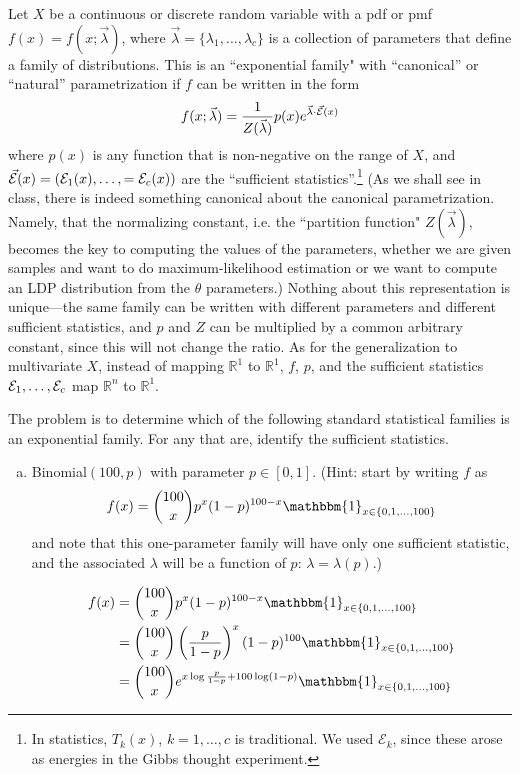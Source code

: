 \documentclass[11pt]{report}
\newcommand{\ind}{{\mathbbm{1}}}
\begin{document}
\begin{enumerate}[1.]
          Let $X$ be a continuous or discrete random variable with a pdf or pmf $f(x) = f(x;\vec{\lambda})$, where $\vec{\lambda} = \{\lambda_1,\ldots,\lambda_c\}$ is a collection of parameters that define a family of distributions. This is an ``exponential family" with ``canonical'' or ``natural'' parametrization if $f$ can be written in the form
          \begin{equation}
              \label{eqn:exp_family}
              f(x;\vec{\lambda}) = \frac{1}{Z(\vec{\lambda})}p(x)e^{\vec{\lambda}\cdot\vec{\cal E}(x)}
          \end{equation}
          where $p(x)$ is any function that is non-negative on the range of $X$, and
          $\vec{\cal E}(x) = ({\cal E}_1(x),\ldots,={\cal E}_c(x))$ are the ``sufficient statistics''.\footnote{In statistics, $T_k(x)$, $k=1,\ldots,c$ is traditional. We used ${\mathcal E}_k$, since these arose as energies in the Gibbs thought experiment.}
          (As we shall see in class, there is indeed something canonical about the canonical parametrization. Namely, that the normalizing constant, i.e. the ``partition function" $Z(\vec{\lambda})$, becomes
          the key to computing the values of the parameters, whether we are given samples and want to do maximum-likelihood estimation or we want to compute an LDP distribution from the $\theta$ parameters.)
          Nothing about this representation is unique---the same family can be written with different  parameters and different sufficient statistics, and $p$ and $Z$ can be multiplied by a common arbitrary constant,
          since this will not change the ratio.
          As for the generalization to multivariate $X$, instead of mapping $\mathds{R}^1$ to $\mathds{R}^1$, $f$, $p$, and the sufficient statistics ${\cal E}_1,\ldots,{\cal E}_c$ map
          $\mathds{R}^n$ to $\mathds{R}^1$.

          The problem is to determine which of the following standard statistical families is an exponential family. For any that are, identify the sufficient statistics.
          \begin{enumerate}[(a)]
              \item Binomial$(100,p)$ with parameter $p\in[0,1]$. (Hint: start by writing $f$ as
                    \[f(x) = {100\choose x}p^x(1-p)^{100-x}\ind_{x\in\{0,1,\ldots,100\}}\] and note that this one-parameter family will have only one sufficient statistic, and the associated $\lambda$ will be a function of $p$: $\lambda = \lambda(p)$.)

                    \color{blue}
                    \begin{align*}
                        f(x) & = {100\choose x}p^x(1-p)^{100-x}\ind_{x\in\{0,1,\ldots,100\}}                             \\
                             & = {100\choose x} \left(\frac{p}{1-p}\right)^x (1 - p)^{100} \ind_{x\in\{0,1,\ldots,100\}} \\
                             & = {100 \choose x} e^{x\log \frac{p}{1 - p} + 100\log(1- p)}\ind_{x\in\{0,1,\ldots,100\}}
                    \end{align*}


\end{enumerate}
\end{enumerate}
\end{document}
